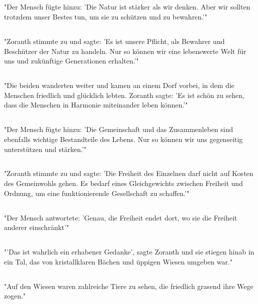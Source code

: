\documentclass{article}
\begin{document}
\subsection{}
"Der Mensch fügte hinzu: 'Die Natur ist stärker als wir denken. Aber wir sollten trotzdem unser Bestes tun, um sie zu schützen und zu bewahren.'"
\subsection{}
"Zoranth stimmte zu und sagte: 'Es ist unsere Pflicht, als Bewahrer und Beschützer der Natur zu handeln. Nur so können wir eine lebenswerte Welt für uns und zukünftige Generationen erhalten.'"
\subsection{}
"Die beiden wanderten weiter und kamen an einem Dorf vorbei, in dem die Menschen friedlich und glücklich lebten. Zoranth sagte: 'Es ist schön zu sehen, dass die Menschen in Harmonie miteinander leben können.'"
\subsection{}
"Der Mensch fügte hinzu: 'Die Gemeinschaft und das Zusammenleben sind ebenfalls wichtige Bestandteile des Lebens. Nur so können wir uns gegenseitig unterstützen und stärken.'"
\subsection{}
"Zoranth stimmte zu und sagte: 'Die Freiheit des Einzelnen darf nicht auf Kosten des Gemeinwohls gehen. Es bedarf eines Gleichgewichts zwischen Freiheit und Ordnung, um eine funktionierende Gesellschaft zu schaffen.'"
\subsection{}
"Der Mensch antwortete: 'Genau, die Freiheit endet dort, wo sie die Freiheit anderer einschränkt'"
\subsection{}
"'Das ist wahrlich ein erhabener Gedanke', sagte Zoranth und sie stiegen hinab in ein Tal, das von kristallklaren Bächen und üppigen Wiesen umgeben war."
\subsection{}
"Auf den Wiesen waren zahlreiche Tiere zu sehen, die friedlich grasend ihre Wege zogen."
\end{document}
